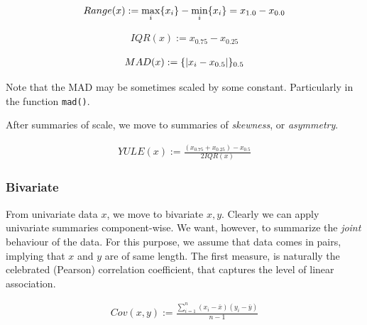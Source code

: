 \begin{definition}
\begin{align}
	Range(x):= \max_i\{ x_i \}-\min_i\{ x_i \}= x_{1.0}-x_{0.0}
\end{align}
\end{definition}

\begin{definition}
\label{def:iqr}
\begin{align}
	IQR(x):= x_{0.75}-x_{0.25}
\end{align}
\end{definition}



\begin{definition}
\label{def:mad}
\begin{align}
	MAD(x):= \{ |x_i-x_{0.5}| \}_{0.5}
\end{align}
\end{definition}
Note that the MAD may be sometimes scaled by some constant. Particularly in the \R function \texttt{mad()}. 


After summaries of scale, we move to summaries of \emph{skewness}, or \emph{asymmetry}.

\begin{definition}
\begin{align}
	YULE(x):= \frac{(x_{0.75}+x_{0.25})-x_{0.5}}{2 IQR(x)}
\end{align}
\end{definition}

 


\subsubsection{Bivariate}
From univariate data $x$, we move to bivariate $x,y$.
Clearly we can apply univariate summaries component-wise. 
We want, however, to summarize the \emph{joint} behaviour of the data. 
For this purpose, we assume that data comes in pairs, implying that $x$ and $y$ are of same length.
The first measure, is naturally the celebrated (Pearson) correlation coefficient, that captures the level of linear association.


\begin{definition}
\begin{align}
	Cov(x,y):= \frac{\sum_{i=1}^{n} (x_i-\bar{x})(y_i-\bar{y})}{n-1}
\end{align}
\end{definition}



